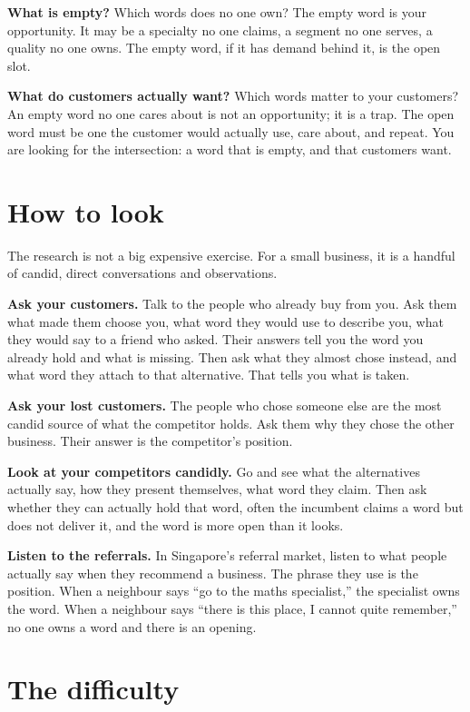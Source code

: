 \documentclass[10pt,twoside,openany]{memoir}
\newcommand{\needspacehead}{\needspace{4\baselineskip}}
\let\oldsection\section
\renewcommand{\section}{\needspacehead\oldsection}
\begin{document}
{\textbf{What is empty?} Which words does no one own? The empty word is
your opportunity. It may be a specialty no one claims, a segment no one
serves, a quality no one owns. The empty word, if it has demand behind
it, is the open slot.

\textbf{What do customers actually want?} Which words matter to your
customers? An empty word no one cares about is not an opportunity; it is
a trap. The open word must be one the customer would actually use, care
about, and repeat. You are looking for the intersection: a word that is
empty, and that customers want.

\section{How to look}\label{how-to-look}

The research is not a big expensive exercise. For a small business, it
is a handful of candid, direct conversations and observations.

\textbf{Ask your customers.} Talk to the people who already buy from
you. Ask them what made them choose you, what word they would use to
describe you, what they would say to a friend who asked. Their answers
tell you the word you already hold and what is missing. Then ask what
they almost chose instead, and what word they attach to that
alternative. That tells you what is taken.

\textbf{Ask your lost customers.} The people who chose someone else are
the most candid source of what the competitor holds. Ask them why they
chose the other business. Their answer is the competitor's position.

\textbf{Look at your competitors candidly.} Go and see what the
alternatives actually say, how they present themselves, what word they
claim. Then ask whether they can actually hold that word, often the
incumbent claims a word but does not deliver it, and the word is more
open than it looks.

\textbf{Listen to the referrals.} In Singapore's referral market, listen
to what people actually say when they recommend a business. The phrase
they use is the position. When a neighbour says ``go to the maths
specialist,'' the specialist owns the word. When a neighbour says
``there is this place, I cannot quite remember,'' no one owns a word and
there is an opening.

\section{The difficulty}\label{the-difficulty}

}
\end{document}
